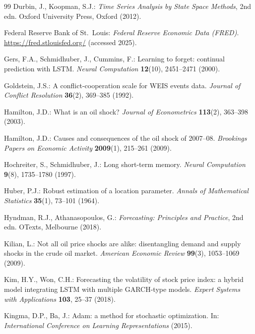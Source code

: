 \documentclass[11pt,a4paper]{article}
\begin{document}
\begin{thebibliography}{99}
Durbin, J., Koopman, S.J.: \emph{Time Series Analysis by State Space Methods}, 2nd edn. Oxford University Press, Oxford (2012).

Federal Reserve Bank of St.\ Louis: \emph{Federal Reserve Economic Data (FRED)}. \url{https://fred.stlouisfed.org/} (accessed 2025).

Gers, F.A., Schmidhuber, J., Cummins, F.: Learning to forget: continual prediction with LSTM. \emph{Neural Computation} \textbf{12}(10), 2451--2471 (2000).

Goldstein, J.S.: A conflict-cooperation scale for WEIS events data. \emph{Journal of Conflict Resolution} \textbf{36}(2), 369--385 (1992).

Hamilton, J.D.: What is an oil shock? \emph{Journal of Econometrics} \textbf{113}(2), 363--398 (2003).

Hamilton, J.D.: Causes and consequences of the oil shock of 2007--08. \emph{Brookings Papers on Economic Activity} \textbf{2009}(1), 215--261 (2009).

Hochreiter, S., Schmidhuber, J.: Long short-term memory. \emph{Neural Computation} \textbf{9}(8), 1735--1780 (1997).

Huber, P.J.: Robust estimation of a location parameter. \emph{Annals of Mathematical Statistics} \textbf{35}(1), 73--101 (1964).

Hyndman, R.J., Athanasopoulos, G.: \emph{Forecasting: Principles and Practice}, 2nd edn. OTexts, Melbourne (2018).

Kilian, L.: Not all oil price shocks are alike: disentangling demand and supply shocks in the crude oil market. \emph{American Economic Review} \textbf{99}(3), 1053--1069 (2009).

Kim, H.Y., Won, C.H.: Forecasting the volatility of stock price index: a hybrid model integrating LSTM with multiple GARCH-type models. \emph{Expert Systems with Applications} \textbf{103}, 25--37 (2018).

Kingma, D.P., Ba, J.: Adam: a method for stochastic optimization. In: \emph{International Conference on Learning Representations} (2015).


\end{thebibliography}
\end{document}
